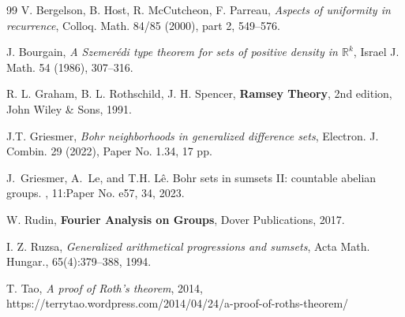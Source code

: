 \documentclass[10pt]{article}
\theoremstyle{definition}
\newcommand{\R}{\mathbb{R}}
\begin{document}
\begin{thebibliography}{99}
V. Bergelson, B. Host, R. McCutcheon, F. Parreau, \emph{Aspects of uniformity in recurrence}, Colloq. Math. 84/85 (2000), part 2, 549--576.  

J. Bourgain, \emph{A Szemer\'edi type theorem for sets of positive density in $\R^k$}, Israel J. Math. 54 (1986), 307--316. 


R. L. Graham, B. L. Rothschild, J. H. Spencer, \textbf{Ramsey Theory}, 2nd edition, John Wiley \& Sons, 1991.

J.T. Griesmer, \emph{Bohr neighborhoods in generalized difference sets}, Electron. J. Combin. 29 (2022), Paper No. 1.34, 17 pp.

J.~Griesmer, A.~Le, and T.H. L\^{e}.
\newblock Bohr sets in sumsets {II}: countable abelian groups.
, 11:Paper No. e57, 34, 2023.

W. Rudin, \textbf{Fourier Analysis on Groups}, Dover Publications, 2017.


 I. Z. Ruzsa, \emph{Generalized arithmetical progressions and sumsets}, Acta Math. Hungar., 65(4):379--388, 1994. 

T. Tao, \emph{A proof of Roth's theorem}, 2014, https://terrytao.wordpress.com/2014/04/24/a-proof-of-roths-theorem/

\end{thebibliography}
\end{document}
